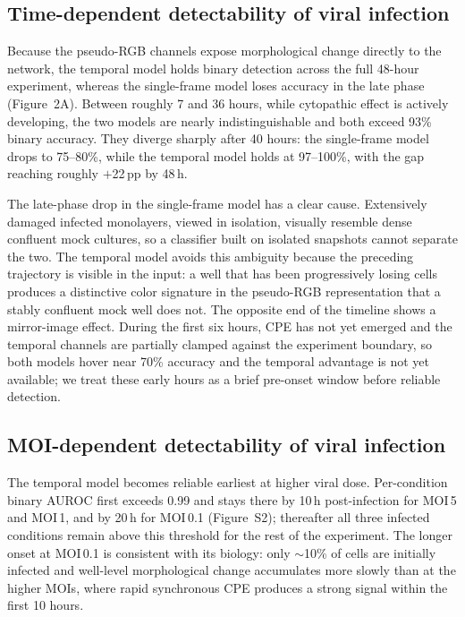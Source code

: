 \documentclass[12pt,letterpaper]{article}
\begin{document}
\subsection*{Time-dependent detectability of viral infection}

Because the pseudo-RGB channels expose morphological change directly to the network, the temporal model holds binary detection across the full 48-hour experiment, whereas the single-frame model loses accuracy in the late phase (Figure~2A). Between roughly 7 and 36 hours, while cytopathic effect is actively developing, the two models are nearly indistinguishable and both exceed 93\% binary accuracy. They diverge sharply after 40 hours: the single-frame model drops to 75--80\%, while the temporal model holds at 97--100\%, with the gap reaching roughly $+$22\,pp by 48\,h.

The late-phase drop in the single-frame model has a clear cause. Extensively damaged infected monolayers, viewed in isolation, visually resemble dense confluent mock cultures, so a classifier built on isolated snapshots cannot separate the two. The temporal model avoids this ambiguity because the preceding trajectory is visible in the input: a well that has been progressively losing cells produces a distinctive color signature in the pseudo-RGB representation that a stably confluent mock well does not. The opposite end of the timeline shows a mirror-image effect. During the first six hours, CPE has not yet emerged and the temporal channels are partially clamped against the experiment boundary, so both models hover near 70\% accuracy and the temporal advantage is not yet available; we treat these early hours as a brief pre-onset window before reliable detection.

\subsection*{MOI-dependent detectability of viral infection}

The temporal model becomes reliable earliest at higher viral dose. Per-condition binary AUROC first exceeds 0.99 and stays there by 10\,h post-infection for MOI\,5 and MOI\,1, and by 20\,h for MOI\,0.1 (Figure~S2); thereafter all three infected conditions remain above this threshold for the rest of the experiment. The longer onset at MOI\,0.1 is consistent with its biology: only $\sim$10\% of cells are initially infected and well-level morphological change accumulates more slowly than at the higher MOIs, where rapid synchronous CPE produces a strong signal within the first 10 hours.
\end{document}
